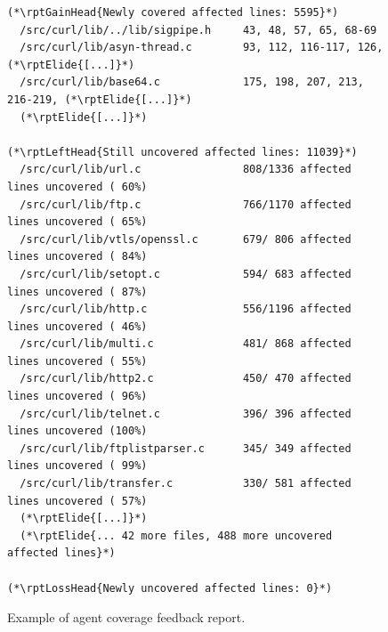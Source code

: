 %


\newcommand{\rptGainHead}[1]{{\color{rptGain}\bfseries #1}}
\newcommand{\rptLeftHead}[1]{{\color{rptLeft}\bfseries #1}}
\newcommand{\rptLossHead}[1]{{\color{rptLoss}\bfseries #1}}
\newcommand{\rptElide}[1]{{\color{rptFade}\itshape #1}}


\begin{figure}[htbp]
  \centering
  \begin{lstlisting}[style=coveragereport]
(*\rptGainHead{Newly covered affected lines: 5595}*)
  /src/curl/lib/../lib/sigpipe.h     43, 48, 57, 65, 68-69
  /src/curl/lib/asyn-thread.c        93, 112, 116-117, 126, (*\rptElide{[...]}*)
  /src/curl/lib/base64.c             175, 198, 207, 213, 216-219, (*\rptElide{[...]}*)
  (*\rptElide{[...]}*)

(*\rptLeftHead{Still uncovered affected lines: 11039}*)
  /src/curl/lib/url.c                808/1336 affected lines uncovered ( 60%)
  /src/curl/lib/ftp.c                766/1170 affected lines uncovered ( 65%)
  /src/curl/lib/vtls/openssl.c       679/ 806 affected lines uncovered ( 84%)
  /src/curl/lib/setopt.c             594/ 683 affected lines uncovered ( 87%)
  /src/curl/lib/http.c               556/1196 affected lines uncovered ( 46%)
  /src/curl/lib/multi.c              481/ 868 affected lines uncovered ( 55%)
  /src/curl/lib/http2.c              450/ 470 affected lines uncovered ( 96%)
  /src/curl/lib/telnet.c             396/ 396 affected lines uncovered (100%)
  /src/curl/lib/ftplistparser.c      345/ 349 affected lines uncovered ( 99%)
  /src/curl/lib/transfer.c           330/ 581 affected lines uncovered ( 57%)
  (*\rptElide{[...]}*)
  (*\rptElide{... 42 more files, 488 more uncovered affected lines}*)

(*\rptLossHead{Newly uncovered affected lines: 0}*)
  \end{lstlisting}
  \caption[Coverage delta report returned to the agent]{Example of agent coverage feedback report.}
  \label{fig:coverage-report}
\end{figure}